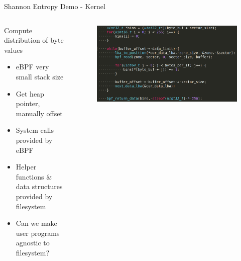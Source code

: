 \documentclass[aspectratio=169, notes]{beamer}
\begin{document}
\begin{frame}{Shannon Entropy Demo - Kernel}
        \begin{columns}
            \begin{column}{0.40\textwidth}
                \footnotesize
                Compute distribution of byte values
                \begin{itemize}
                    \item eBPF very small stack size
                    \item Get heap pointer, manually offset
                    \item System calls provided by eBPF
                    \item Helper functions \& data structures provided
                          by filesystem
                    \item Can we make user programs agnostic to filesystem?
                \end{itemize}
            \end{column}
            \begin{column}{0.60\textwidth}
                \begingroup
                \small
                \begin{figure}
                    \centering
                    \includegraphics[width=1\textwidth]{resources/images/demo-kernel.png}
                \end{figure}
                \endgroup
            \end{column}
        \end{columns}
\end{frame}
\end{document}
